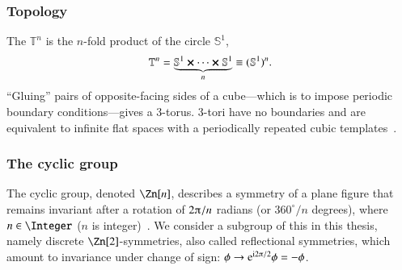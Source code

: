 





    \subsubsection{Topology}
    The  $\mathbb{T}^n$ is the $n$-fold product of the circle $\mathbb{S}^1$, %
    ~\citep{lancasterQuantumFieldTheory2014} 
    \begin{equation}
        \mathbb{T}^n = \underbrace{\mathbb{S}^1 \cross \cdots \cross \mathbb{S}^1}_{n} \equiv (\mathbb{S}^1)^n.
    \end{equation}
    ``Gluing'' pairs of opposite-facing sides of a cube---which is to impose periodic boundary conditions---gives a 3-torus. %
    3-tori have no boundaries and are equivalent to infinite flat spaces with a periodically repeated cubic templates~\citep{carrollSpacetimeGeometryIntroduction2019}.
    
    
    
    



    \subsubsection{The cyclic group}
    The cyclic group, denoted $\Zn[n]$, describes a symmetry of a plane figure that remains invariant after a rotation of $2\ppi/n$ radians (or $360^\circ/n$ degrees), where $n\in \Integer$ ($n$ is integer)~\citep{lancasterQuantumFieldTheory2014}. We consider a subgroup of this in this thesis, namely discrete $\Zn[2]$-symmetries, also called reflectional symmetries, which amount to invariance under change of sign: $\phi \to\eu[\im 2\ppi/2] \phi  = -\phi$.








